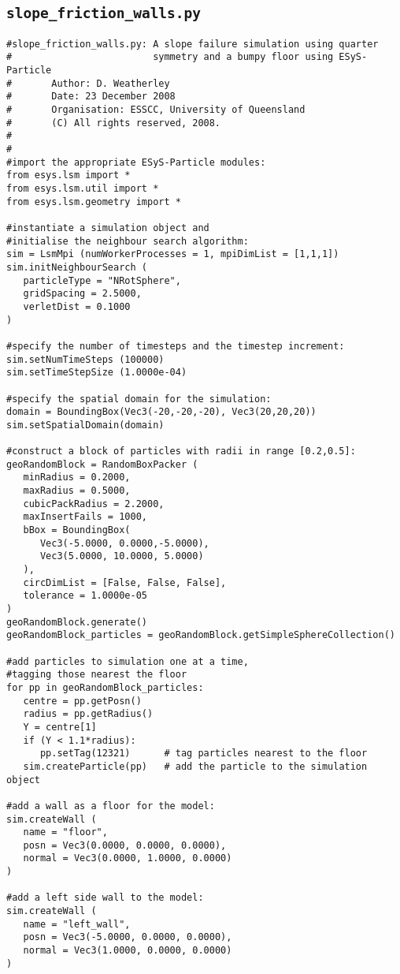 \subsection{\texttt{slope\_friction\_walls.py}}\label{code:slope_friction_walls}
\begin{verbatim}
#slope_friction_walls.py: A slope failure simulation using quarter 
#                         symmetry and a bumpy floor using ESyS-Particle
#       Author: D. Weatherley
#       Date: 23 December 2008
#       Organisation: ESSCC, University of Queensland
#       (C) All rights reserved, 2008.
#
#
#import the appropriate ESyS-Particle modules:
from esys.lsm import *
from esys.lsm.util import *
from esys.lsm.geometry import *

#instantiate a simulation object and 
#initialise the neighbour search algorithm:
sim = LsmMpi (numWorkerProcesses = 1, mpiDimList = [1,1,1])
sim.initNeighbourSearch (
   particleType = "NRotSphere",
   gridSpacing = 2.5000,
   verletDist = 0.1000
)

#specify the number of timesteps and the timestep increment:
sim.setNumTimeSteps (100000)
sim.setTimeStepSize (1.0000e-04)

#specify the spatial domain for the simulation:
domain = BoundingBox(Vec3(-20,-20,-20), Vec3(20,20,20))
sim.setSpatialDomain(domain)

#construct a block of particles with radii in range [0.2,0.5]:
geoRandomBlock = RandomBoxPacker (
   minRadius = 0.2000,
   maxRadius = 0.5000,
   cubicPackRadius = 2.2000,
   maxInsertFails = 1000,
   bBox = BoundingBox(
      Vec3(-5.0000, 0.0000,-5.0000),
      Vec3(5.0000, 10.0000, 5.0000)
   ),
   circDimList = [False, False, False],
   tolerance = 1.0000e-05
)
geoRandomBlock.generate()
geoRandomBlock_particles = geoRandomBlock.getSimpleSphereCollection()

#add particles to simulation one at a time, 
#tagging those nearest the floor
for pp in geoRandomBlock_particles:
   centre = pp.getPosn()
   radius = pp.getRadius()
   Y = centre[1]
   if (Y < 1.1*radius):
      pp.setTag(12321)		# tag particles nearest to the floor
   sim.createParticle(pp)	# add the particle to the simulation object

#add a wall as a floor for the model:
sim.createWall (
   name = "floor",
   posn = Vec3(0.0000, 0.0000, 0.0000),
   normal = Vec3(0.0000, 1.0000, 0.0000)
)

#add a left side wall to the model:
sim.createWall (
   name = "left_wall",
   posn = Vec3(-5.0000, 0.0000, 0.0000),
   normal = Vec3(1.0000, 0.0000, 0.0000)
)


\end{verbatim}
